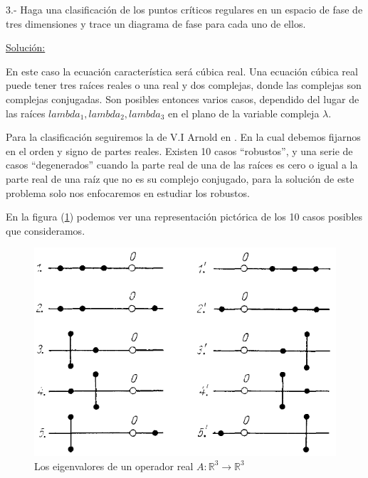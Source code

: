 \documentclass[a4paper,10pt]{article}
\begin{document}
3.- Haga una clasificación de los puntos críticos regulares en un espacio de fase 
de tres dimensiones y trace un diagrama de fase para cada uno de ellos.

\vspace{.3cm}

\underline{Solución:}\vspace{.3cm}

En este caso la ecuación característica será cúbica real. Una ecuación cúbica real puede
tener tres raíces reales o una real y dos complejas, donde las complejas son complejas conjugadas.
Son posibles entonces varios casos, dependido del lugar de las raíces $lambda_1, lambda_2, lambda_3$
en el plano de la variable compleja $\lambda$.

Para la clasificación seguiremos la de V.I Arnold en \cite{arnold}. En la cual debemos
fijarnos en el orden y signo de partes reales. Existen 10 casos ``robustos'', y una 
serie de casos ``degenerados'' cuando la parte real de una de las raíces es cero
o igual a la parte real de una raíz que no es su complejo conjugado, para la 
solución de este problema solo nos enfocaremos en estudiar los robustos. 

\vspace{.3cm}

En la figura (\ref{fig:problema3fig1}) podemos ver una representación pictórica de los
10 casos posibles que consideramos. 

\begin{figure}[h!]
 \centering
\includegraphics[scale=0.3]{problema3fig1}
\caption{Los eigenvalores de un operador real $A: \mathbb{R}^3 \rightarrow \mathbb{R}^3$}
\label{fig:problema3fig1}
\end{figure}
\end{document}
